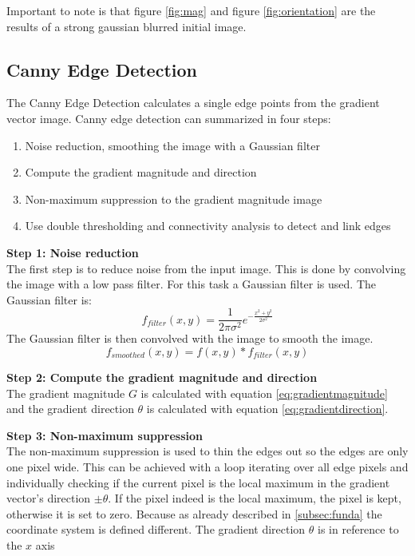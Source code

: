     Important to note is that figure \ref{fig:mag} and figure \ref{fig:orientation} are the results of a strong gaussian blurred initial image. 
    \subsection{Canny Edge Detection } 
    The Canny Edge Detection \cite{gonzalez_canny_nodate} calculates a single edge points from the gradient vector image.  
    Canny edge detection can summarized in four steps: 
    \begin{enumerate}
        \item Noise reduction, smoothing the image with a Gaussian filter
        \item Compute the gradient magnitude and direction
        \item Non-maximum suppression to the gradient magnitude image
        \item Use double thresholding and connectivity analysis to detect and link edges
    \end{enumerate}
\textbf{Step 1: Noise reduction} \\
The first step is to reduce noise from the input image. This is done by convolving the image with a low pass filter. For this task a Gaussian filter is used. The Gaussian filter is:
\begin{equation}
    f_{filter}(x,y) = \frac{1}{2\pi\sigma^2}e^{-\frac{x^2+y^2}{2\sigma^2}}
\end{equation}
The Gaussian filter is then convolved with the image to smooth the image. 
\begin{equation}
    f_{smoothed}(x,y) = f(x,y) * f_{filter}(x,y)
\end{equation} 

\textbf{Step 2: Compute the gradient magnitude and direction} \\
The gradient magnitude $G$ is calculated with equation \ref{eq:gradientmagnitude} and the gradient direction $\theta$ is calculated with equation \ref{eq:gradientdirection}.

\textbf{Step 3: Non-maximum suppression} \\
The non-maximum suppression is used to thin the edges out so the edges are only one pixel wide. This can be achieved with a loop iterating over all edge pixels and individually checking if the current pixel is the local maximum in the gradient vector's direction $\pm \theta$. If the pixel indeed is the local maximum, the pixel is kept, otherwise it is set to zero. Because as already described in \ref{subsec:funda} the coordinate system is defined different. The gradient direction $\theta$ is in reference to the $x$ axis


